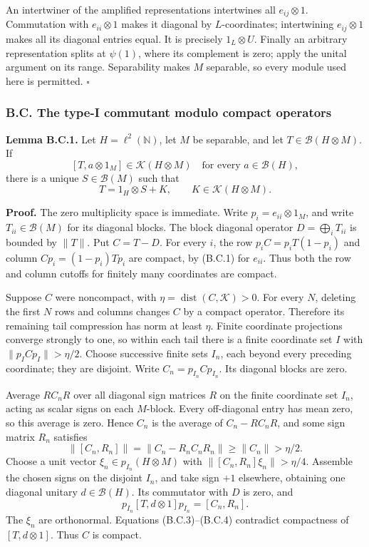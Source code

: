 \documentclass[
  11pt,
]{article}
\begin{document}
An intertwiner of the amplified representations intertwines all
\(e_{ij}\otimes1\). Commutation with \(e_{ii}\otimes1\) makes it
diagonal by \(L\)-coordinates; intertwining \(e_{ij}\otimes1\) makes all
its diagonal entries equal. It is precisely \(1_L\otimes U\). Finally an
arbitrary representation splits at \(\psi(1)\), where its complement is
zero; apply the unital argument on its range. Separability makes \(M\)
separable, so every module used here is permitted. \(\square\)

\subsubsection{B.C. The type-I commutant modulo compact
operators}\label{b.c.-the-type-i-commutant-modulo-compact-operators}

\textbf{Lemma B.C.1.} Let \(H=\ell^2(\mathbb N)\), let \(M\) be
separable, and let \(T\in\mathcal B(H\otimes M)\). If \[
[T,a\otimes1_M]\in\mathcal K(H\otimes M)
\quad\text{for every }a\in\mathcal B(H),
\tag{B.C.1}
\] there is a unique \(S\in\mathcal B(M)\) such that \[
T=1_H\otimes S+K,\qquad K\in\mathcal K(H\otimes M).
\tag{B.C.2}
\]

\textbf{Proof.} The zero multiplicity space is immediate. Write
\(p_i=e_{ii}\otimes1_M\), and write \(T_{ii}\in\mathcal B(M)\) for its
diagonal blocks. The block diagonal operator \(D=\bigoplus_iT_{ii}\) is
bounded by \(\|T\|\). Put \(C=T-D\). For every \(i\), the row
\(p_iC=p_iT(1-p_i)\) and column \(Cp_i=(1-p_i)Tp_i\) are compact, by
(B.C.1) for \(e_{ii}\). Thus both the row and column cutoffs for
finitely many coordinates are compact.

Suppose \(C\) were noncompact, with
\(\eta=\operatorname{dist}(C,\mathcal K)>0\). For every \(N\), deleting
the first \(N\) rows and columns changes \(C\) by a compact operator.
Therefore its remaining tail compression has norm at least \(\eta\).
Finite coordinate projections converge strongly to one, so within each
tail there is a finite coordinate set \(I\) with
\(\|p_I C p_I\|>\eta/2\). Choose successive finite sets \(I_n\), each
beyond every preceding coordinate; they are disjoint. Write
\(C_n=p_{I_n}Cp_{I_n}\). Its diagonal blocks are zero.

Average \(R C_n R\) over all diagonal sign matrices \(R\) on the finite
coordinate set \(I_n\), acting as scalar signs on each \(M\)-block.
Every off-diagonal entry has mean zero, so this average is zero. Hence
\(C_n\) is the average of \(C_n-RC_nR\), and some sign matrix \(R_n\)
satisfies \[
\|[C_n,R_n]\|=\|C_n-R_nC_nR_n\|
\ge\|C_n\|>\eta/2.
\tag{B.C.3}
\] Choose a unit vector \(\xi_n\in p_{I_n}(H\otimes M)\) with
\(\|[C_n,R_n]\xi_n\|>\eta/4\). Assemble the chosen signs on the disjoint
\(I_n\), and take sign \(+1\) elsewhere, obtaining one diagonal unitary
\(d\in\mathcal B(H)\). Its commutator with \(D\) is zero, and \[
p_{I_n}[T,d\otimes1]p_{I_n}=[C_n,R_n].
\tag{B.C.4}
\] The \(\xi_n\) are orthonormal. Equations (B.C.3)--(B.C.4) contradict
compactness of \([T,d\otimes1]\). Thus \(C\) is compact.
\end{document}
